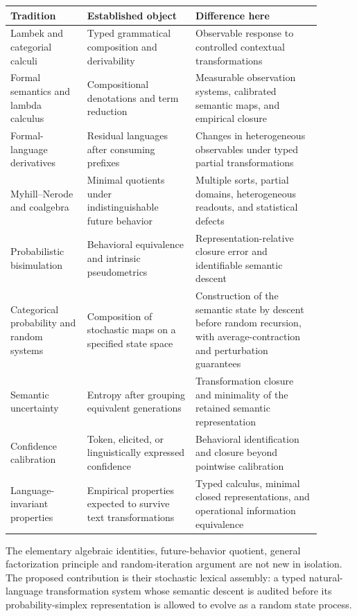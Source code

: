 \documentclass[11pt]{article}
\begin{document}
{\begin{center}
\begin{tabular}{p{0.22\linewidth}p{0.31\linewidth}p{0.36\linewidth}}
\toprule
Tradition & Established object & Difference here\\
\midrule
Lambek and categorial calculi \cite{lambek1958,moortgat2011} & Typed grammatical composition and derivability & Observable response to controlled contextual transformations\\
Formal semantics and lambda calculus \cite{clark2016,ehrhard2003} & Compositional denotations and term reduction & Measurable observation systems, calibrated semantic maps, and empirical closure\\
Formal-language derivatives \cite{brzozowski1964} & Residual languages after consuming prefixes & Changes in heterogeneous observables under typed partial transformations\\
Myhill--Nerode and coalgebra \cite{nerode1958,rutten2000,silva2013} & Minimal quotients under indistinguishable future behavior & Multiple sorts, partial domains, heterogeneous readouts, and statistical defects\\
Probabilistic bisimulation \cite{baldan2018,desharnais2002,vanbreugel2005} & Behavioral equivalence and intrinsic pseudometrics & Representation-relative closure error and identifiable semantic descent\\
Categorical probability and random systems \cite{fritz2022,jacobs2023} &
Composition of stochastic maps on a specified state space &
Construction of the semantic state by descent before random recursion, with
average-contraction and perturbation guarantees\\
Semantic uncertainty \cite{farquhar2024,kuhn2023} & Entropy after grouping equivalent generations & Transformation closure and minimality of the retained semantic representation\\
Confidence calibration \cite{band2024,kadavath2022,kumar2024,tian2023} & Token, elicited, or linguistically expressed confidence & Behavioral identification and closure beyond pointwise calibration\\
Language-invariant properties \cite{bianchi2022} & Empirical properties expected to survive text transformations & Typed calculus, minimal closed representations, and operational information equivalence\\
\bottomrule
\end{tabular}
\end{center}

The elementary algebraic identities, future-behavior quotient, general
factorization principle and random-iteration argument are not new in
isolation.  The proposed contribution is their stochastic lexical assembly:
a typed natural-language transformation system whose semantic descent is
audited before its probability-simplex representation is allowed to evolve as
a random state process.

}
\end{document}
